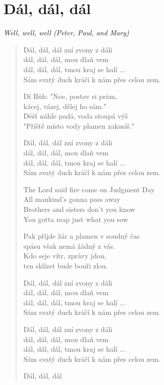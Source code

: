 \section{Dál, dál, dál}
\textit{Well, well, well (Peter, Paul, and Mary)}

\begin{verse}
Dál, dál, dál zní zvony z dáli \\
dál, dál, dál, mou dlaň vem \\
dál, dál, dál, tmou kraj se halí ... \\
Sám svatý duch kráčí k nám přes celou zem.

Dí Bůh: "Noe, postav si prám, \\
kácej, vázej, dělej ho sám." \\
Déšť náhle padá, voda stoupá výš \\
"Příště místo vody plamen zakusíš."

Dál, dál, dál zní zvony z dáli \\
dál, dál, dál, mou dlaň vem \\
dál, dál, dál, tmou kraj se halí ... \\
Sám svatý duch kráčí k nám přes celou zem.

The Lord said fire come on Judgment Day \\
All mankind's gonna pass away \\
Brothers and sisters don't you know \\
You gotta reap just what you sow

Pak příjde žár a plamen v soudný čas \\ 
spásu však nemá žádný z vás. \\
Kdo seje vítr, zprávy jdou, \\
ten sklízet bude bouři zlou. 


Dál, dál, dál zní zvony z dáli \\
dál, dál, dál, mou dlaň vem \\
dál, dál, dál, tmou kraj se halí ... \\
Sám svatý duch kráčí k nám přes celou zem.

Dál, dál, dál zní zvony z dáli \\
dál, dál, dál, mou dlaň vem \\
dál, dál, dál, tmou kraj se halí ... \\
Sám svatý duch kráčí k nám přes celou zem.

Dál, dál, dál
\end{verse}
